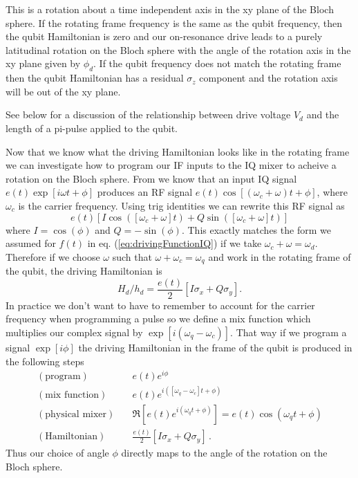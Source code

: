 This is a rotation about a time independent axis in the xy plane of the Bloch sphere.
If the rotating frame frequency is the same as the qubit frequency, then the qubit Hamiltonian is zero and our on-resonance drive leads to a purely latitudinal rotation on the Bloch sphere with the angle of the rotation axis in the xy plane given by $\phi_d$.
If the qubit frequency does not match the rotating frame then the qubit Hamiltonian has a residual $\sigma_z$ component and the rotation axis will be out of the xy plane.

See below for a discussion of the relationship between drive voltage $V_d$ and the length of a pi-pulse applied to the qubit.


Now that we know what the driving Hamiltonian looks like in the rotating frame we can investigate how to program our IF inputs to the IQ mixer to acheive a rotation on the Bloch sphere.
From  we know that an input IQ signal $e(t)\exp\left[i\omega t + \phi\right]$ produces an RF signal $ e(t)\cos\left[(\omega_c+\omega)t + \phi \right]$, where $\omega_c$ is the carrier frequency. Using trig identities we can rewrite this RF signal as \begin{equation}
e(t) \left[ I\cos(\left[\omega_c+\omega\right] t) + Q\sin(\left[\omega_c+\omega\right]t)\right] \nonumber \end{equation}
where $I=\cos(\phi)$ and $Q=-\sin(\phi)$.
This exactly matches the form we assumed for $f(t)$ in eq. (\ref{eq:drivingFunctionIQ}) if we take $\omega_c + \omega = \omega_d$.
Therefore if we choose $\omega$ such that $\omega + \omega_c = \omega_q$ and work in the rotating frame of the qubit, the driving Hamiltonian is \begin{equation}
H_d/h_d = \frac{e(t)}{2}\left[I\sigma_x + Q\sigma_y\right]. \end{equation}
In practice we don't want to have to remember to account for the carrier frequency when programming a pulse so we define a mix function which multiplies our complex signal by $\exp\left[i(\omega_{q} - \omega_c)\right]$.
That way if we program a signal $\exp\left[i\phi\right]$ the driving Hamiltonian in the frame of the qubit is produced in the following steps
\begin{align*}
  (\text{program}) & \quad e(t) e^{i\phi} \\
  (\text{mix function}) & \quad e(t) e^{i([\omega_q-\omega_c]t + \phi)} \\
  (\text{physical mixer}) & \quad \Re \left[ e(t) e^{i(\omega_q t + \phi)} \right] = e(t) \cos\left(\omega_q t + \phi \right) \\
  (\text{Hamiltonian}) & \quad \frac{e(t)}{2}\left[ I \sigma_x + Q \sigma_y \right] \, .
\end{align*}
Thus our choice of angle $\phi$ directly maps to the angle of the rotation on the Bloch sphere.

